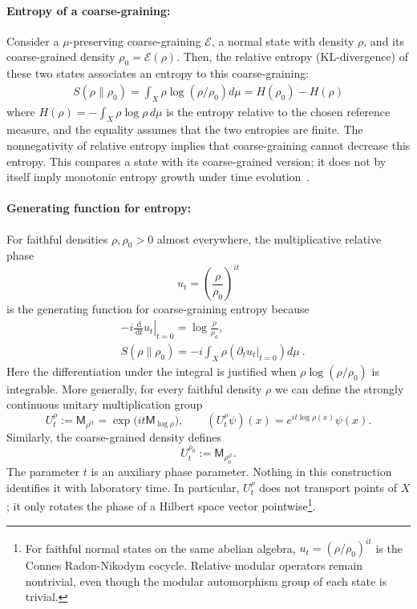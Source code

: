 \documentclass[a4paper,11pt]{article}
\theoremstyle{definition}
\newcommand{\dd}{\,\mathrm{d}}
\newcommand{\Mop}{\mathsf{M}}
\newcommand{\nn}{\nonumber}
\newcommand{\mE}{\mathcal{E}}
\begin{document}
\paragraph{Entropy of a coarse-graining:} Consider a $\mu$-preserving coarse-graining $\mE$, a normal state with density $\rho$, and its coarse-grained density $\rho_0=\mE(\rho)$. Then, the relative entropy (KL-divergence) of these two states associates an entropy to this coarse-graining:
\begin{align}
    \label{eq:KL-classical}
    S(\rho\|\rho_0)=\int_X \rho \log(\rho/\rho_0)d\mu=H(\rho_0)-H(\rho)
\end{align}
where $H(\rho)=-\int_X\rho\log\rho\,d\mu$ is the entropy relative to the chosen reference measure, and the equality assumes that the two entropies are finite. The nonnegativity of relative entropy implies that coarse-graining cannot decrease this entropy. This compares a state with its coarse-grained version; it does not by itself imply monotonic entropy growth under time evolution~\cite{Lashkari2019EntanglementScale}.

\paragraph{Generating function for entropy:} For faithful densities $\rho,\rho_0>0$ almost everywhere, the multiplicative relative phase
\[
u_t
=
\left(\frac{\rho}{\rho_0}\right)^{it}
\]
is the generating function for coarse-graining entropy because
\begin{align}
&-i\left.\frac{\dd}{\dd t}u_t\right|_{t=0}
=
\log\frac{\rho}{\rho_0},\nn\\
&S(\rho\|\rho_0)=-i \int_X \rho (\partial_t u_t\big|_{t=0})d\mu\ .
\end{align}
Here the differentiation under the integral is justified when $\rho\log(\rho/\rho_0)$ is integrable. More generally, for every faithful density $\rho$ we can define the strongly continuous unitary multiplication group
\[
  U_t^\rho:=\Mop_{\rho^{it}}
  =\exp\!\bigl(it\Mop_{\log\rho}\bigr),
  \qquad
  (U_t^\rho\psi)(x)=e^{it\log\rho(x)}\psi(x).
\]
Similarly, the coarse-grained density defines
\[
  U_t^{\rho_0}:=\Mop_{\rho_0^{it}}.
\]
The parameter $t$ is an auxiliary phase parameter. Nothing in this construction identifies it with laboratory time. In particular, $U_t^\rho$ does not transport points of $X$; it only rotates the phase of a Hilbert space vector pointwise\footnote{For faithful normal states on the same abelian algebra, $u_t=(\rho/\rho_0)^{it}$ is the Connes Radon-Nikodym cocycle. Relative modular operators remain nontrivial, even though the modular automorphism group of each state is trivial.}.
\end{document}
